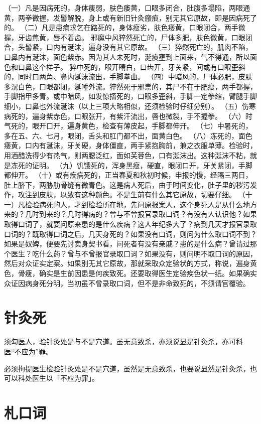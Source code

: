 \documentclass[12pt,UTF8]{ctexbook}
\begin{document}
（一）凡是因病死的，身体瘦弱，肤色痿黄，口眼多闭合，肚腹多塌陷，两眼通黄，两拳微握，发髻解脱，身上或有新旧针灸瘢痕，别无其它原故，即是因病死了的。
（二）凡是患病求乞在路死的，身体瘦劣，肤色痿黄，口眼闭合，两手微握，牙齿焦黄，唇不着齿。
邪魔中风猝然死亡的，尸体多肥，肤色微黄，口眼闭合，头髻紧，口内有涎沫，遍身没有其它原故。
（三）猝然死亡的，肌肉不陷，口鼻内有涎沫，面色紫赤。因为其人未死时，涎痰壅到上面来，气不得通，所以面色和口鼻这个样子。
猝中死的，眼开睛白，口齿开，牙关紧，间或有口眼歪斜的，同时口两角、鼻内涎沫流出，手脚拳曲。
（四）中暗风的，尸体必肥，皮肤多滉白色，口眼都闭，涎唾外流。猝然死于邪祟的，其尸不在于肥瘦，两手都握，手脚指甲多青。或中暗风，如发惊搐死的，口眼多歪斜，手脚一定拳缩，臂腿手脚细小，口鼻也外流涎沫（以上三项大略相似，还须检验时仔细分别）。
（五）伤寒病死的，遍身紫赤色，口眼张开，有紫汗流出，唇也微裂，手不握拳。
（六）时气死的，眼开口开，遍身黄色，检查有薄皮起，手脚都伸开。
（七）中暑死的，多在五、六、七月，眼闭，舌头和肛门都不出，面黄白色。
（八）冻死的，面色痿黄，口内有涎沫，牙关硬，身体僵直，两手紧抱胸前，兼之衣服单薄。检验时，用酒醋洗得少有热气，则两腮泛红，面如芙蓉色，口有涎沫出。这种涎沫不粘，就是冻死的证明。
（九）饥饿死的，浑身黑瘦，硬直，眼闭口开，牙关紧闭，手脚都伸开。
（十）或有疾病死的，正当春夏和秋初时候，申报的慢，经隔三两日，肚上脐下，两胁肋骨缝有微青色。这是病人死后，由于时间变化，肚子里的秽污发作，攻注到皮肤，以致有这种颜色。不是生前有什么其它原故，切要仔细。
（十一）凡检验病死的人，才到检验所在地，先问原报案人，这个身死人是从什么地方来的？几时到来的？几时得病的？曾与不曾报官录取口词？有没有人认识他？如果取得口词了，就要问原来患的是什么疾病？这人年纪多大了？病到几天才报官录取口词的？既取得口词之后，几天身死的？如果没有口词，则问为什么取口词不到？如果是奴婢，便要先讨卖身契书看，问死者有没有亲戚？患的是什么病？曾请过那个医生？吃什么药？曾与不曾报官录取口词？如果没有，则问明不取口词的原因，然后对众证实定案。如果别无其它原故，那就采取众定验状的方式，称说，遍身黄色，骨瘦，确实是生前因患是何疾致死。还要取得医生定验疾色状一纸。如果确实众证因病身死分明，当初虽不曾录取口词，但不是非命致死的，不须请官覆验。


\chapter{针灸死}

须勾医人，验针灸处是与不是穴道。虽无意致杀，亦须说显是针灸杀，亦可科医“不应为”罪。


必须拘提医生检验针灸处是不是穴道，虽然是无意致杀，也要说显然是针灸杀，也可以科处医生以「不应为罪」。


\chapter{札口词}
\end{document}
